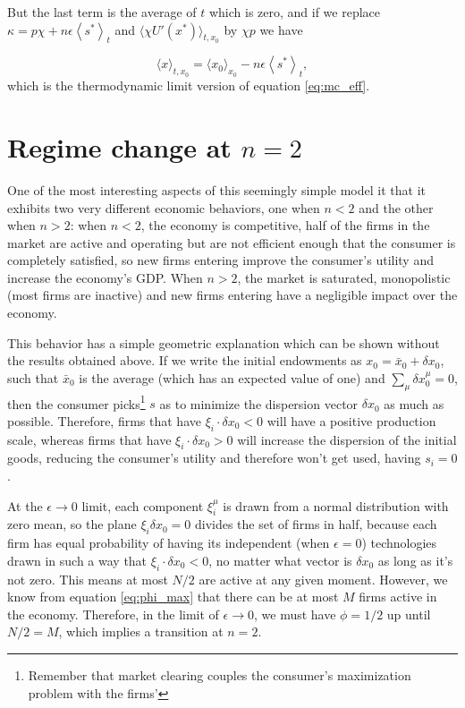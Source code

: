 But the last term is the average of $t$ which is zero, and if we replace $\kappa = p \chi + n\epsilon \left \langle s^* \right \rangle_t$ and $\langle \chi U'(x^\ast) \rangle_{t, x_0}$ by $\chi p$ we have

\begin{equation}
    \langle x \rangle_{t, x_0} =  \langle x_0 \rangle_{x_0} - n\epsilon  \left \langle s^* \right \rangle_t,
\end{equation}
which is the thermodynamic limit version of equation \ref{eq:mc_eff}. 


\section{Regime change at $n=2$}

One of the most interesting aspects of this seemingly simple model it that it exhibits two very different economic behaviors, one when $n<2$ and the other when $n>2$: when $n < 2$, the economy is competitive, half of the firms in the market are active and operating but are not efficient enough that the consumer is completely satisfied, so new firms entering improve the consumer's utility and increase the economy's GDP. When $n > 2$, the market is saturated, monopolistic (most firms are inactive) and new firms entering have a negligible impact over the economy.

This behavior has a simple geometric explanation which can be shown without the results obtained above. If we write the initial endowments as $x_0 = \bar{x}_0 + \delta x_0$, such that $\bar{x}_0$ is the average (which has an expected value of one) and $\sum_\mu \delta x_0^\mu = 0$, then the consumer picks\footnote{Remember that market clearing couples the consumer's maximization problem with the firms'} $s$ as to minimize the dispersion vector $\delta x_0$ as much as possible. Therefore, firms that have $\xi_i \cdot \delta x_0 < 0$ will have a positive production scale, whereas firms that have $\xi_i \cdot \delta x_0 > 0$ will increase the dispersion of the initial goods, reducing the consumer's utility and therefore won't get used, having $s_i = 0$.

At the $\epsilon \to 0$ limit, each component $\xi_i^\mu$ is drawn from a normal distribution with zero mean, so the plane $\xi_i \delta x_0 = 0$ divides the set of firms in half, because each firm has equal probability of having its independent (when $\epsilon = 0$) technologies drawn in such a way that $\xi_i \cdot \delta x_0 < 0$, no matter what vector is $\delta x_0$ as long as it's not zero. This means at most $N/2$ are active at any given moment. However, we know from equation \eqref{eq:phi_max} that there can be at most $M$ firms active in the economy. Therefore, in the limit of $\epsilon \to 0$, we must have $\phi = 1/2$ up until $N/2 = M$, which implies a transition at $n = 2$.

